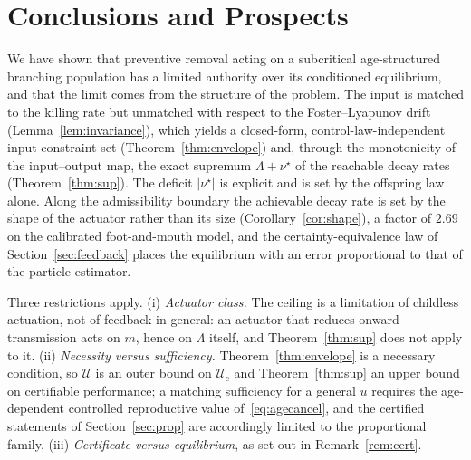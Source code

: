 \documentclass[letterpaper, 10pt, conference]{ieeeconf}
\newcommand{\calU}{\mathcal{U}}
\newcommand{\Lbar}{\Lambda}
\newcommand{\rev}[1]{#1}
\newcommand{\pl}[1]{#1}
\begin{document}



\section{Conclusions and Prospects}
\label{sec:concl}
\rev{We have shown that preventive removal acting on a subcritical age-structured
branching population has a \pl{limited} authority over its conditioned
equilibrium\pl{, and that the limit comes from the structure of the problem}. The input is matched to the killing rate but unmatched with respect
to the Foster--Lyapunov drift (Lemma~\ref{lem:invariance}), which yields a
closed-form, control-law-independent input constraint set
(Theorem~\ref{thm:envelope}) and, through the monotonicity of the input--output
map, the exact supremum $\Lbar+\nu^\star$ of the reachable decay rates
(Theorem~\ref{thm:sup}). The deficit $|\nu^\star|$ is explicit and is set by the
offspring law alone. Along the admissibility boundary the achievable decay rate
is \pl{set} by the shape of the actuator rather than its \pl{size}
(Corollary~\ref{cor:shape}), a factor of $2.69$ on the calibrated foot-and-mouth
model, and the certainty-equivalence law of Section~\ref{sec:feedback} places
the equilibrium with an error proportional to that of the particle estimator.

\pl{Three restrictions apply.} (i) \emph{Actuator class.} The
ceiling is a limitation of \pl{childless} actuation, not of feedback \pl{in
general}: an actuator that \pl{reduces} onward transmission acts on $m$, hence on $\Lbar$ itself,
and Theorem~\ref{thm:sup} does not apply to it. (ii) \emph{Necessity versus
sufficiency.} Theorem~\ref{thm:envelope} is a necessary condition, so $\calU$ is
an outer bound on $\calU_{\mathrm c}$ and Theorem~\ref{thm:sup} an upper bound
on certifiable performance; a matching sufficiency for a general $u$ requires
the age-dependent controlled reproductive value of~\eqref{eq:agecancel}, and the
certified statements of Section~\ref{sec:prop} are accordingly \pl{limited} to the
proportional family. (iii) \emph{Certificate versus equilibrium}, as \pl{set out}
in Remark~\ref{rem:cert}.

}
\end{document}
